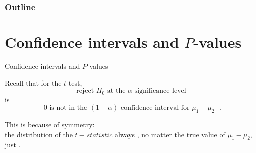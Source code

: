 %
%
%



\subtitle{hypothesis testing, and one-sided tests}

\date{5 March 2015}





\begin{frame}
  \maketitle
\end{frame}


\begin{frame}\frametitle<presentation>{Outline}
  \tableofcontents
\end{frame}

\section{Confidence intervals and $P$-values}


\begin{frame}{Confidence intervals and $P$-values}

    Recall that
  for the $t$-test,
  \[  \text{reject $H_0$ at the $\alpha$ significance level} \]
  is 
  \[  \text{ 0 is not in the $(1-\alpha)$-confidence interval for $\mu_1-\mu_2$ }. \]

  \vspace{2em}

  This is because of \alert{symmetry}: \\
  the distribution of the $t-statistic$ always ,
  no matter the true value of $\mu_1 - \mu_2$,
  just .

\end{frame}

